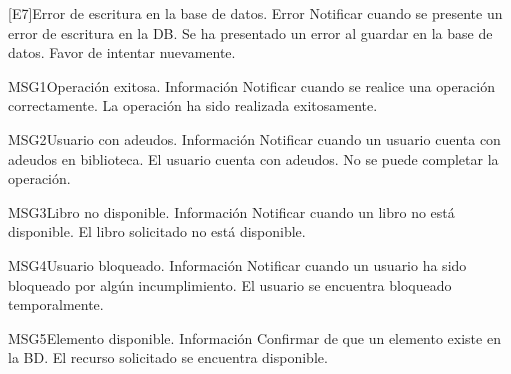 \begin{Citemize}
		\item
		\begin{Message}{[E7]}{Error de escritura en la base de datos.}
			\MSGitem[Tipo: ] Error
			\MSGitem[Objetivo: ] Notificar cuando se presente un error de escritura en la DB.
			\MSGitem[Redacción: ] Se ha presentado un error al guardar en la base de datos. Favor de intentar nuevamente.
		\end{Message}
		
	
		\item
		\begin{Message}{MSG1}{Operación exitosa.}
			\MSGitem[Tipo: ] Información
			\MSGitem[Objetivo: ] Notificar cuando se realice una operación correctamente.
			\MSGitem[Redacción: ] La operación ha sido realizada exitosamente.
		\end{Message}
		
		\item
		\begin{Message}{MSG2}{Usuario con adeudos.}
			\MSGitem[Tipo: ] Información
			\MSGitem[Objetivo: ] Notificar cuando un usuario cuenta con adeudos en biblioteca.
			\MSGitem[Redacción: ] El usuario cuenta con adeudos. No se puede completar la operación.
		\end{Message}
		
		\item
		\begin{Message}{MSG3}{Libro no disponible.}
			\MSGitem[Tipo: ] Información
			\MSGitem[Objetivo: ] Notificar cuando un libro no está disponible.
			\MSGitem[Redacción: ] El libro solicitado no está disponible.
		\end{Message}
		
		\item
		\begin{Message}{MSG4}{Usuario bloqueado.}
			\MSGitem[Tipo: ] Información
			\MSGitem[Objetivo: ] Notificar cuando un usuario ha sido bloqueado por algún incumplimiento.
			\MSGitem[Redacción: ] El usuario se encuentra bloqueado temporalmente.
		\end{Message}
		
		\item
		\begin{Message}{MSG5}{Elemento disponible.}
			\MSGitem[Tipo: ] Información
			\MSGitem[Objetivo: ] Confirmar de que un elemento existe en la BD.
			\MSGitem[Redacción: ] El recurso solicitado se encuentra disponible.
		\end{Message}
	

\end{Citemize}
